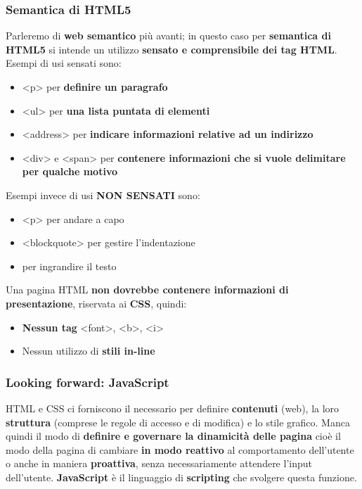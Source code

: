 \documentclass[12pt]{article}
\begin{document}
\subsubsection{Semantica di HTML5}
Parleremo di \textbf{web semantico} più avanti; in questo caso per \textbf{semantica di HTML5} si intende un utilizzo \textbf{sensato e comprensibile dei tag HTML}.
Esempi di usi sensati sono:
\begin{itemize}
    \item <p> per \textbf{definire un paragrafo}
    \item <ul> per \textbf{una lista puntata di elementi}
    \item <address> per \textbf{indicare informazioni relative ad un indirizzo}
    \item <div> e <span> per \textbf{contenere informazioni che si vuole delimitare per qualche motivo}
\end{itemize}
Esempi invece di usi \textbf{NON SENSATI} sono:
\begin{itemize}
    \item <p> per andare a capo
    \item <blockquote> per gestire l'indentazione
    \item <h1> per ingrandire il testo
\end{itemize}
Una pagina HTML \textbf{non dovrebbe contenere informazioni di presentazione}, riservata ai \textbf{CSS}, quindi:
\begin{itemize}
    \item \textbf{Nessun tag} <font>, <b>, <i>
    \item Nessun utilizzo di \textbf{stili in-line}
\end{itemize}
\subsubsection{Looking forward: JavaScript}
HTML  e CSS ci forniscono il necessario per definire \textbf{contenuti} (web), la loro \textbf{struttura} (comprese le regole di accesso e di modifica) e lo stile grafico.
Manca quindi il modo di \textbf{definire e governare la dinamicità delle pagina} cioè il modo della pagina di cambiare \textbf{in modo reattivo} al comportamento dell'utente o anche in maniera \textbf{proattiva}, senza
necessariamente attendere l'input dell'utente. \textbf{JavaScript} è il linguaggio di \textbf{scripting} che svolgere questa funzione.
\end{document}
